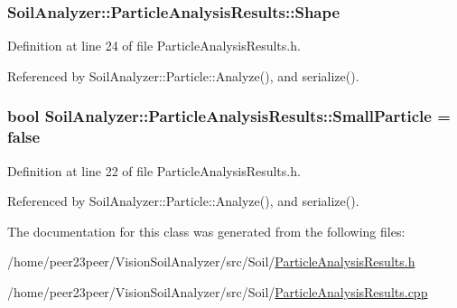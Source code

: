 \subsubsection[{Shape}]{ Soil\+Analyzer\+::\+Particle\+Analysis\+Results\+::\+Shape}\label{class_soil_analyzer_1_1_particle_analysis_results_a75230aa0675b2df489c08bcfffb43b97}


Definition at line 24 of file Particle\+Analysis\+Results.\+h.



Referenced by Soil\+Analyzer\+::\+Particle\+::\+Analyze(), and serialize().

\hypertarget{class_soil_analyzer_1_1_particle_analysis_results_a8aaa7f053d68bce6f1ad2b7bcd30cd95}{}
\subsubsection[{Small\+Particle}]{\setlength{\rightskip}{0pt plus 5cm}bool Soil\+Analyzer\+::\+Particle\+Analysis\+Results\+::\+Small\+Particle = false}\label{class_soil_analyzer_1_1_particle_analysis_results_a8aaa7f053d68bce6f1ad2b7bcd30cd95}


Definition at line 22 of file Particle\+Analysis\+Results.\+h.



Referenced by Soil\+Analyzer\+::\+Particle\+::\+Analyze(), and serialize().



The documentation for this class was generated from the following files\+:\begin{DoxyCompactItemize}
\item 
/home/peer23peer/\+Vision\+Soil\+Analyzer/src/\+Soil/\hyperlink{_particle_analysis_results_8h}{Particle\+Analysis\+Results.\+h}\item 
/home/peer23peer/\+Vision\+Soil\+Analyzer/src/\+Soil/\hyperlink{_particle_analysis_results_8cpp}{Particle\+Analysis\+Results.\+cpp}\end{DoxyCompactItemize}
